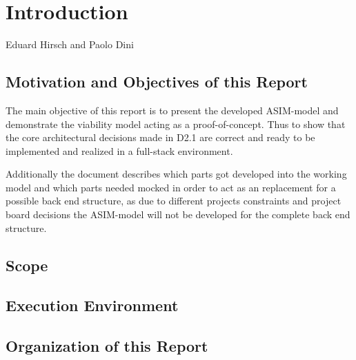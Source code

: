 \chapter{Introduction}
\label{ch:Introduction}

\vspace{-1cm}
\begin{center}
Eduard Hirsch and Paolo Dini
\end{center}


\section{Motivation and Objectives of this Report}

The main objective of this report is to present the developed ASIM-model
and demonstrate the viability model acting as a proof-of-concept. Thus to show
that the core architectural decisions made in D2.1 are correct and ready to be
implemented and realized in a full-stack environment.

Additionally the document describes which parts got developed into
the working model and which parts needed mocked in order to act as
an replacement for a possible back end structure, as due to different
projects constraints and project board decisions the ASIM-model will
not be developed for the complete back end structure.

\section{Scope}


\section{Execution Environment}


\section{Organization of this Report}


\newpage











